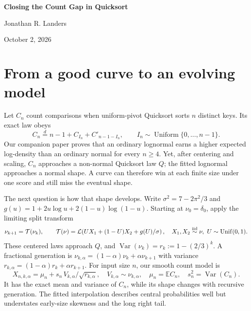 \documentclass[10pt]{article}
\begin{document}
\begin{center}
{\LARGE\bfseries Closing the Count Gap in Quicksort\par}
\vspace{5pt}
{\normalsize Jonathan R. Landers\par}
\vspace{2pt}
{\small October 2, 2026\par}
\end{center}
\vspace{4pt}

\begin{abstract}
Randomized Quicksort has a discrete comparison-count law at every finite size,
but its limiting law is continuous. We formalize a way to measure the finite-size
gap in bits, give a construction that closes it exactly, and explain why that
construction does not recover the tree's dynamics. A finite-size split model and
an error bound show how to pursue a useful, compact approximation instead.
\end{abstract}

\section*{From a good curve to an evolving model}
Let $C_n$ count comparisons when uniform-pivot Quicksort sorts $n$ distinct
keys. Its exact law obeys
\begin{equation}
 C_n\overset{d}=n-1+C_{I_n}+C'_{n-1-I_n},
 \qquad I_n\sim\operatorname{Uniform}\{0,\ldots,n-1\}.
 \label{eq:recurrence}
\end{equation}
Our companion paper proves that an ordinary lognormal earns a higher expected
log-density than an ordinary normal for every $n\geq4$. Yet, after centering
and scaling, $C_n$ approaches a non-normal Quicksort law $Q$; the fitted
lognormal approaches a normal shape. A curve can therefore win at each finite
size under one score and still miss the eventual shape.

The next question is how that shape develops. Write
$\sigma^2=7-2\pi^2/3$ and
$g(u)=1+2u\log u+2(1-u)\log(1-u)$. Starting at $\nu_0=\delta_0$,
apply the limiting split transform
\begin{equation}
 \nu_{k+1}=\mathcal T(\nu_k),\qquad
 \mathcal T(\nu)=\mathcal L\!\left(
 U X_1+(1-U)X_2+g(U)/\sigma\right),
 \quad X_1,X_2\stackrel{\mathrm{iid}}{\sim}\nu,\ U\sim{\rm Unif}(0,1).
 \label{eq:transform}
\end{equation}
These centered laws approach $Q$, and
$\operatorname{Var}(\nu_k)=r_k:=1-(2/3)^k$. A fractional generation is
$\nu_{k,\alpha}=(1-\alpha)\nu_k+\alpha\nu_{k+1}$ with variance
$r_{k,\alpha}=(1-\alpha)r_k+\alpha r_{k+1}$.
For input size $n$, our smooth count model is
\begin{equation}
 X_{n,k,\alpha}=\mu_n+
 s_n\,V_{k,\alpha}/\sqrt{r_{k,\alpha}},
 \quad V_{k,\alpha}\sim\nu_{k,\alpha},\quad
 \mu_n=\mathbb EC_n,\quad s_n^2=\operatorname{Var}(C_n).
 \label{eq:interpolation}
\end{equation}
It has the exact mean and variance of $C_n$, while its shape changes with
recursive generation. The fitted interpolation describes central probabilities
well but understates early-size skewness and the long right tail.
\end{document}

